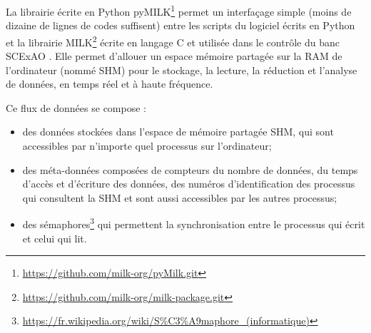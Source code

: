 

La librairie écrite en Python \ac{pyMILK}\footnote{\url{https://github.com/milk-org/pyMilk.git}} permet un interfaçage simple (moins de dizaine de lignes de codes suffisent) entre les scripts du logiciel écrits en Python et la librairie \ac{MILK}\footnote{\url{https://github.com/milk-org/milk-package.git}} écrite en langage C et utilisée dans le contrôle du banc \ac{SCExAO} \citep{guyon2020}. Elle permet d'allouer un espace mémoire partagée sur la \ac{RAM} de l'ordinateur (nommé \ac{SHM}) pour le stockage, la lecture, la réduction et l'analyse de données, en temps réel et à haute fréquence.

Ce flux de données se compose :
\begin{itemize}
    \item des données stockées dans l'espace de mémoire partagée \ac{SHM}, qui sont accessibles par n'importe quel processus sur l'ordinateur;
    \item des méta-données composées de compteurs du nombre de données, du temps d'accès et d'écriture des données, des numéros d'identification des processus qui consultent la \ac{SHM} et sont aussi accessibles par les autres processus;
    \item des sémaphores\footnote{\url{https://fr.wikipedia.org/wiki/S\%C3\%A9maphore_(informatique)}} qui permettent la synchronisation entre le processus qui écrit et celui qui lit.
\end{itemize}

